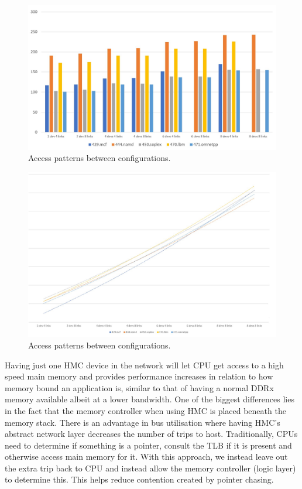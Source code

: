 \begin{figure}[!ht]
    \centering
    \includegraphics[width=1.0\linewidth]{figure/all-apps-latencies.jpg}
    \caption{Access patterns between configurations.}
    \label{All-apps-latency}
\end{figure}

\begin{figure}[!ht]
    \centering
    \includegraphics[width=1.0\linewidth]{figure/all-apps-latencies-trends.jpg}
    \caption{Access patterns between configurations.}
    \label{All-apps-latency-trends}
\end{figure}

Having just one HMC device in the network will let CPU get access to a high speed main memory and provides performance increases in relation to how memory bound an application is, similar to that of having a normal DDRx memory available albeit at a lower bandwidth. One of the biggest differences lies in the fact that the memory controller when using HMC is placed beneath the memory stack. There is an advantage in bus utilisation where having HMC's abstract network layer decreases the number of trips to host. Traditionally, CPUs need to determine if something is a pointer, consult the TLB if it is present and otherwise access main memory for it. With this approach, we instead leave out the extra trip back to CPU and instead allow the memory controller (logic layer) to determine this. This helps reduce contention created by pointer chasing.
\bigskip

